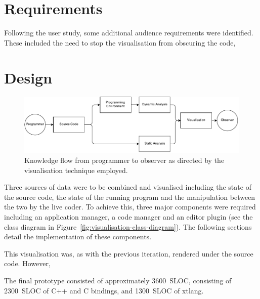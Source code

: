 
\section{Requirements}

Following the user study, some additional audience requirements were identified. These included the need to stop the visualisation from obscuring the code, 

\more

\section{Design}



\begin{figure}
  \centering \includegraphics[width=\columnwidth]{../images/diagrams/knowledge-flow-refined.pdf}
  \caption{Knowledge flow from programmer to observer as directed by the visualisation technique employed.}
\label{fig:knowledge-flow-refined}
\end{figure}

Three sources of data were to be combined and visualised including the state of the source code, the state of the running program and the manipulation between the two by the live coder. To achieve this, three major components were required including an application manager, a code manager and an editor plugin (see the class diagram in Figure~\ref{fig:visualisation-class-diagram}). The following sections detail the implementation of these components.

This visualisation was, as with the previous iteration, rendered under the source code. However, \more

The final prototype consisted of approximately 3600~\ac{SLOC}, consisting of 2300~\ac{SLOC} of C++ and C bindings, and 1300~\ac{SLOC} of xtlang.

